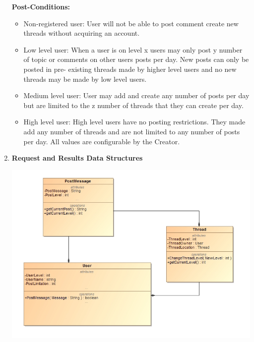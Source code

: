 \documentclass[11pt]{article}
\begin{document}
\begin{enumerate}
		\textbf{Post-Conditions: }
		\begin{itemize}
			\item Non-registered user:
			User will not be able to post comment create new threads without acquiring an account.
			\item Low level user:
			When a user is on level x users may only post y number of topic or comments on other users posts per day. New posts can only be posted in pre-		existing threads made by higher level users and no new threads may be made by low level users. 
			\item Medium level user:
			User may add and create any number of posts per day but are limited to the z number of threads that they can create per day.
			\item High level user:
			High level users have no posting restrictions. They made add any number of threads and are not limited to any number of posts per day.
		 	All values are configurable by the Creator.
		 \end{itemize}
		 \newpage
		 \item	\textbf{Request and Results Data Structures}
		 	  		\begin{center}
		 	  			\includegraphics[scale=0.5]{Diagrams/B1 ClassDiagram.png}
		 	  		\end{center}


\end{enumerate}
\end{document}
